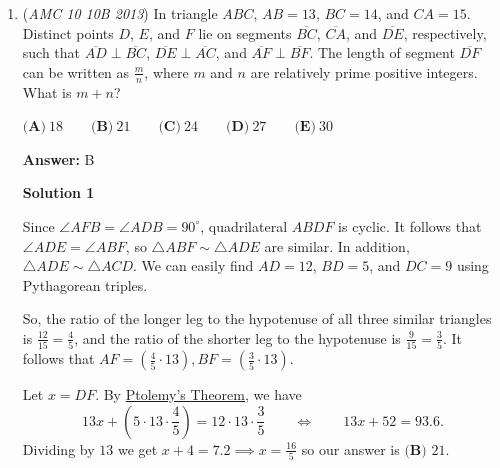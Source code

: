 \begin{enumerate}
 \textbf{Remark} Solutions 1 and 2 state that $J=1, 5, 9$ without rigorous analysis. Here it is:

 \begin{verbatim}
Let $S=A+J+E=B+J+F=C+J+G=D+J+H$$4S=A+B+C+D+E+F+G+H+4J$$4S=45+3J$$4S=3(15+J)$
\end{verbatim}

Because $gcd(4,3)=1$, $4|(15+J)$, but $15 \equiv 3 \pmod 4$, so $J \equiv 1 \pmod 4$, $J=1,5,9$
\begin{verbatim}
When $J=1, S=12, A+E=B+F=C+G=D+H=11$When $J=5, S=15, A+E=B+F=C+G=D+H=10$When $J=9, S=18, A+E=B+F=C+G=D+H=9$
\end{verbatim}




	\item (\textit{AMC 10 10B 2013}) In triangle $ABC$, $AB = 13$, $BC = 14$, and $CA = 15$. Distinct points $D$, $E$, and $F$ lie on segments $\overline{BC}$, $\overline{CA}$, and $\overline{DE}$, respectively, such that $\overline{AD} \perp \overline{BC}$, $\overline{DE} \perp \overline{AC}$, and $\overline{AF} \perp \overline{BF}$. The length of segment $\overline{DF}$ can be written as $\frac{m}{n}$, where $m$ and $n$ are relatively prime positive integers. What is $m + n$?


 

$\textbf{(A)}\ 18\qquad\textbf{(B)}\ 21\qquad\textbf{(C)}\ 24\qquad\textbf{(D)}\ 27\qquad\textbf{(E)}\ 30$

 \textbf{Answer: }B



\textbf{Solution 1}

Since $\angle{AFB}=\angle{ADB}=90^{\circ}$, quadrilateral $ABDF$ is cyclic. It follows that $\angle{ADE}=\angle{ABF}$, so $\triangle ABF \sim \triangle ADE$ are similar. In addition, $\triangle ADE \sim \triangle ACD$. We can easily find $AD=12$, $BD = 5$, and $DC=9$ using Pythagorean triples. 

 So, the ratio of the longer leg to the hypotenuse of all three similar triangles is $\frac{12}{15} = \frac{4}{5}$, and the ratio of the shorter leg to the hypotenuse is $\frac{9}{15} = \frac{3}{5}$. It follows that $AF=(\frac{4}{5}\cdot 13), BF=(\frac{3}{5}\cdot 13)$. 

 Let $x=DF$. By \href{https://artofproblemsolving.com/wiki/index.php?title=Ptolemy\%27s\_Theorem}{Ptolemy's Theorem}, we have 
 \[13x+\left(5\cdot 13\cdot \frac{4}{5}\right)= 12\cdot 13\cdot \frac{3}{5} \qquad \Leftrightarrow \qquad 13x+52=93.6.\] Dividing by $13$ we get $x+4=7.2\implies x=\frac{16}{5}$ so our answer is $\boxed{\textbf{(B) }21}$.


\end{enumerate}
